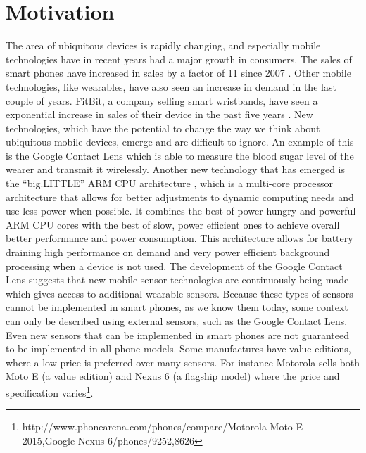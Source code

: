 
\section{Motivation}
\label{sec:motivation}

The area of ubiquitous devices is rapidly changing, and especially mobile technologies have in recent years had a major growth in consumers. The sales of smart phones have increased in sales by a factor of 11 since 2007 \parencite{statsia_smartphones}. Other mobile technologies, like wearables, have also seen an increase in demand in the last couple of years. FitBit, a company selling smart wristbands, have seen a exponential increase in sales of their device in the past five years \parencite{statsia_fitbit}. New technologies, which have the potential to change the way we think about ubiquitous mobile devices, emerge and are difficult to ignore. An example of this is the Google Contact Lens \parencite{google_contact_lens} which is able to measure the blood sugar level of the wearer and transmit it wirelessly. Another new technology that has emerged is the ``big.LITTLE'' ARM CPU architecture \parencite{big_little_architecture}, which is a multi-core processor architecture that allows for better adjustments to dynamic computing needs and use less power when possible. It combines the best of power hungry and powerful ARM CPU cores with the best of slow, power efficient ones to achieve overall better performance and power consumption. This architecture allows for battery draining high performance on demand and very power efficient background processing when a device is not used. The development of the Google Contact Lens suggests that new mobile sensor technologies are continuously being made which gives access to additional wearable sensors. Because these types of sensors cannot be implemented in smart phones, as we know them today, some context can only be described using external sensors, such as the Google Contact Lens. Even new sensors that can be implemented in smart phones are not guaranteed to be implemented in all phone models. Some manufactures have value editions, where a low price is preferred over many sensors. For instance Motorola sells both Moto E (a value edition) and Nexus 6 (a flagship model) where the price and specification varies\footnote{http://www.phonearena.com/phones/compare/Motorola-Moto-E-2015,Google-Nexus-6/phones/9252,8626}.
